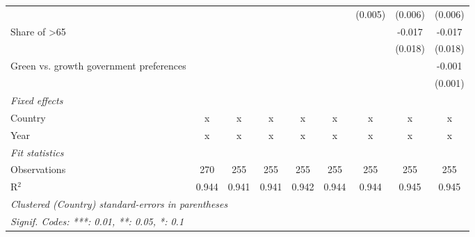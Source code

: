 \begin{table}[htbp]
\begin{tabular}{lcccccccc}
                                                        &         &         &         &         &         & (0.005) & (0.006) & (0.006)\\   
      Share of >65                                      &         &         &         &         &         &         & -0.017  & -0.017\\   
                                                        &         &         &         &         &         &         & (0.018) & (0.018)\\   
      Green vs. growth government preferences           &         &         &         &         &         &         &         & -0.001\\   
                                                        &         &         &         &         &         &         &         & (0.001)\\   
      \emph{Fixed effects}\\
      Country                                           & x       & x       & x       & x       & x       & x       & x       & x\\  
      Year                                              & x       & x       & x       & x       & x       & x       & x       & x\\  
      \midrule \emph{Fit statistics}\\
      Observations                                      & 270     & 255     & 255     & 255     & 255     & 255     & 255     & 255\\  
      R$^2$                                             & 0.944   & 0.941   & 0.941   & 0.942   & 0.944   & 0.944   & 0.945   & 0.945\\  
      \midrule
      \multicolumn{9}{l}{\emph{Clustered (Country) standard-errors in parentheses}}\\
      \multicolumn{9}{l}{\emph{Signif. Codes: ***: 0.01, **: 0.05, *: 0.1}}\\
   \end{tabular}
\end{table}



